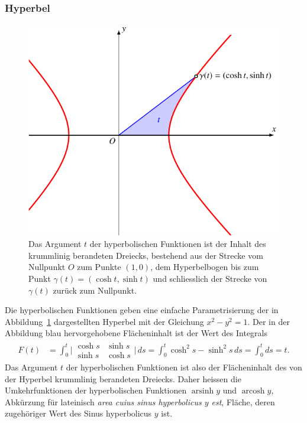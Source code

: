 %
%
\subsubsection{Hyperbel}
\begin{figure}
\centering
\includegraphics{chapters/030-geometrie/images/hyperbelflaeche.pdf}
\caption{Das Argument $t$ der hyperbolischen Funktionen ist der Inhalt
des krummlinig berandeten Dreiecks, bestehend aus der Strecke 
vom Nullpunkt $O$ zum Punkte $(1,0)$, dem Hyperbelbogen bis zum
Punkt $\gamma(t)=(\cosh t,\sinh t)$ und schliesslich der Strecke
von $\gamma(t)$ zurück zum Nullpunkt.
\label{buch:geometrie:fig:hyperbelflaeche}}
\end{figure}
Die hyperbolischen Funktionen geben eine einfache Parametrisierung
der in Abbildung~\ref{buch:geometrie:fig:hyperbelflaeche}
dargestellten Hyperbel mit der Gleichung
\(
x^2-y^2=1
\).
Der in der Abbildung blau hervorgehobene Flächeninhalt ist der Wert
des Integrals
\begin{align*}
F(t)
&=
\int_0^t
\biggl|
\begin{matrix}
\cosh s&\sinh s\\
\sinh s&\cosh s
\end{matrix}
\biggr|
\,ds
=
\int_0^t
\cosh^2s-\sinh^2s\,ds
=
\int_0^t ds = t.
\end{align*}
Das Argument $t$ der hyperbolischen Funktionen ist also der Flächeninhalt
des von der Hyperbel krummlinig berandeten Dreiecks.
Daher heissen die Umkehrfunktionen der hyperbolischen Funktionen
$\operatorname{arsinh}y$ und $\operatorname{arcosh}y$, Abkürzung
für lateinisch {\em area cuius sinus hyperbolicus $y$ est},
Fläche, deren zugehöriger
Wert des Sinus hyperbolicus $y$ ist.

